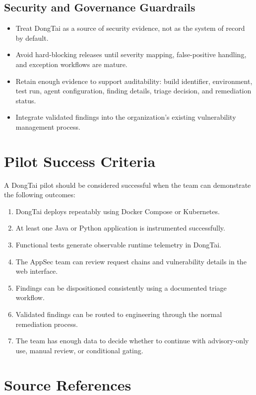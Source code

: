 \documentclass[11pt]{article}
\begin{document}
\subsection{Security and Governance Guardrails}

\begin{itemize}
  \item Treat DongTai as a source of security evidence, not as the system of record by default.
  \item Avoid hard-blocking releases until severity mapping, false-positive handling, and exception workflows are mature.
  \item Retain enough evidence to support auditability: build identifier, environment, test run, agent configuration, finding details, triage decision, and remediation status.
  \item Integrate validated findings into the organization's existing vulnerability management process.
\end{itemize}

\section{Pilot Success Criteria}

A DongTai pilot should be considered successful when the team can demonstrate the following outcomes:

\begin{enumerate}
  \item DongTai deploys repeatably using Docker Compose or Kubernetes.
  \item At least one Java or Python application is instrumented successfully.
  \item Functional tests generate observable runtime telemetry in DongTai.
  \item The AppSec team can review request chains and vulnerability details in the web interface.
  \item Findings can be dispositioned consistently using a documented triage workflow.
  \item Validated findings can be routed to engineering through the normal remediation process.
  \item The team has enough data to decide whether to continue with advisory-only use, manual review, or conditional gating.
\end{enumerate}

\section{Source References}
\end{document}
